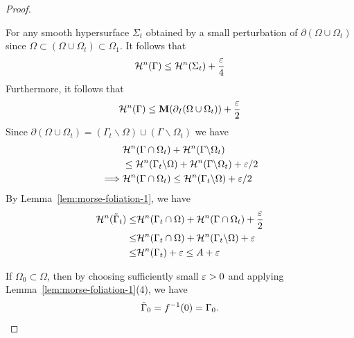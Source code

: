 \begin{lemma}
\begin{proof}
\begin{itemize}
            For any smooth hypersurface $\Sigma_t$ obtained by a small perturbation of $\partial(\Omega\cup\Omega_t)$ since $\Omega \subset (\Omega\cup\Omega_t) \subset \Omega_1$. It follows that
            \begin{equation*}
                \mathcal{H}^n(\Gamma) \leq \mathcal{H}^n(\Sigma_t) + \frac{\varepsilon}{4}
            \end{equation*}
            Furthermore, it follows that
            \begin{equation*}
                \mathcal{H}^n(\Gamma) \leq \mathbf{M}(\partial_I(\Omega\cup\Omega_t)) + \frac{\varepsilon}{2}
            \end{equation*}
            Since $\partial(\Omega\cup\Omega_t) = (\Gamma_t\backslash\Omega)\cup(\Gamma\backslash\Omega_t)$ we have
            \begin{equation*}
                \begin{split}
                    &\mathcal{H}^n(\Gamma\cap\Omega_t) + \mathcal{H}^n(\Gamma\backslash\Omega_t) \\
                    &\leq \mathcal{H}^n(\Gamma_t\backslash\Omega) + \mathcal{H}^n(\Gamma\backslash\Omega_t) + \varepsilon/2\\
                    \implies & \mathcal{H}^n(\Gamma\cap\Omega_t) \leq \mathcal{H}^n(\Gamma_t\backslash\Omega) + \varepsilon/2
                \end{split}
            \end{equation*}
        By Lemma~\ref{lem:morse-foliation-1}, we have
        \begin{equation*}
            \begin{split}
                \mathcal{H}^n(\Tilde{\Gamma}_t) \leq& \mathcal{H}^n(\Gamma_t\cap \Omega) + \mathcal{H}^n(\Gamma\cap\Omega_t) + \frac{\varepsilon}{2}\\
                \leq& \mathcal{H}^n(\Gamma_t\cap \Omega) + \mathcal{H}^n(\Gamma_t\backslash\Omega) + \varepsilon\\
                \leq& \mathcal{H}^n(\Gamma_t) + \varepsilon \leq A + \varepsilon
            \end{split}
        \end{equation*}
        \end{itemize}
        If $\Omega_0 \subset \Omega$, then by choosing sufficiently small $\varepsilon > 0$ and applying Lemma~\ref{lem:morse-foliation-1}(4), we have
        \begin{equation*}
            \Tilde{\Gamma}_0 = f^{-1}(0) = \Gamma_0.
        \end{equation*}

\end{proof}
\end{lemma}
